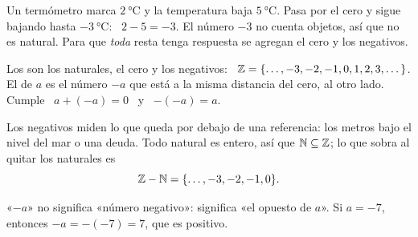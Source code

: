 \documentclass[11pt,a4paper]{article}
\newcommand{\recta}[2]{%
  \draw[zink,line width=0.8pt,{Stealth[length=2mm]}-{Stealth[length=2mm]}] (#1-0.6,0) -- (#2+0.6,0);
  \foreach \k in {#1,...,#2} {\draw[zink] (\k,0.09) -- (\k,-0.09); \node[font=\footnotesize,text=zmute,below] at (\k,-0.08) {$\k$};}}
\let\nivelzuka\nivel
\renewcommand{\nivel}[2]{\Needspace{5\baselineskip}\nivelzuka{#1}{#2}}
\begin{document}
\begin{ejemplo}[El termómetro]
Un termómetro marca $\SI{2}{\celsius}$ y la temperatura baja $\SI{5}{\celsius}$. Pasa por el cero y sigue bajando hasta
$\SI{-3}{\celsius}$: \ $2-5=-3$. El número $-3$ no cuenta objetos, así que no es natural. Para que \emph{toda} resta tenga
respuesta se agregan el cero y los negativos.
\end{ejemplo}

\begin{definicion}
Los  son los naturales, el cero y los negativos: \ $\mathbb{Z}=\{\dots,-3,-2,-1,0,1,2,3,\dots\}$.
El  de $a$ es el número $-a$ que está a la misma distancia del cero, al otro lado. Cumple
\ $a+(-a)=0$ \ y \ $-(-a)=a$.
\end{definicion}

\begin{figura}
\end{figura}

Los negativos miden lo que queda por debajo de una referencia: los metros bajo el nivel del mar o una deuda. Todo
natural es entero, así que $\mathbb{N}\subseteq\mathbb{Z}$; lo que sobra al quitar los naturales es
\[ \mathbb{Z}-\mathbb{N}=\{\dots,-3,-2,-1,0\}. \]
\begin{ojo}
«$-a$» no significa «número negativo»: significa «el opuesto de $a$». Si $a=-7$, entonces $-a=-(-7)=7$, que es positivo.
\end{ojo}

\end{document}
